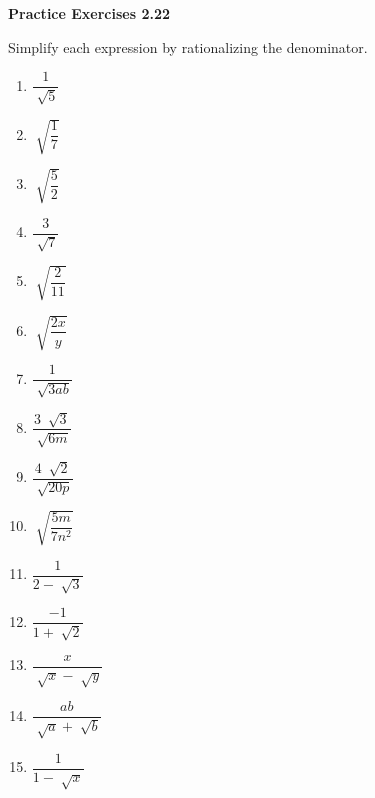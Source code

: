 \vspace{1ex}
\noindent\textbf{Practice Exercises 2.22}

\vspace{0.75ex}

Simplify each expression by rationalizing the denominator.

\begin{multicols}{3}
\begin{enumerate}[noitemsep, label = \color{blue}\arabic*. ]
\item \( \dfrac{1}{\sqrt[]{5}} \)
\item \( \sqrt[]{\dfrac{1}{7}} \)
\item \( \sqrt[]{\dfrac{5}{2}} \)
\item \( \dfrac{3}{\sqrt[]{7}} \)
\item \( \sqrt[]{\dfrac{2}{11}} \)
\item \( \sqrt[]{\dfrac{2x}{y}} \)
\item \( \dfrac{1}{\sqrt[]{3ab}} \)
\item \( \dfrac{3~ \sqrt[]{3}}{\sqrt[]{6m}} \)
\item \( \dfrac{4~ \sqrt[]{2}}{\sqrt[]{20p}} \)
\item \( \sqrt[]{\dfrac{5m}{7 n^{2}}} \)
\item \( \dfrac{1}{2- \sqrt[]{3}} \)
\item \( \dfrac{-1}{1 + \sqrt[]{2}} \)
\item \( \dfrac{x}{\sqrt[]{x} - \sqrt[]{y}} \)
\item \( \dfrac{ab}{\sqrt[]{a} + \sqrt[]{b}} \)
\item \( \dfrac{1}{1 - \sqrt[]{x}} \)  
\end{enumerate}
\end{multicols}
